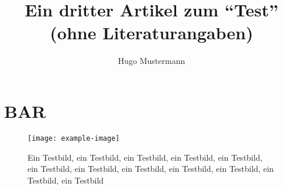 \documentclass{dtk2}
\author{Hugo Mustermann}
\begin{document}
\title{Ein dritter Artikel zum "`Test"' (ohne Literaturangaben)}

\maketitle

\section{BAR}

\blindtext

\begin{figure}[p] \centering
  \texttt{[image: example-image]}
  \caption{Ein Testbild, ein Testbild, ein Testbild, ein Testbild, ein
  Testbild, ein Testbild, ein Testbild, ein Testbild, ein Testbild, ein
  Testbild, ein Testbild, ein Testbild}
\end{figure}
\end{document}
